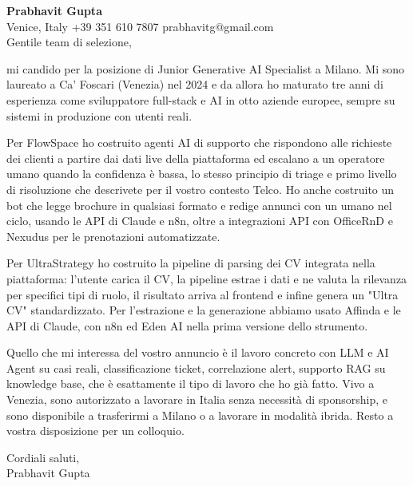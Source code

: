 \documentclass[a4paper,10.5pt]{article}
\begin{document}
\textbf{Prabhavit Gupta}\\
Venice, Italy \textbar{} +39 351 610 7807 \textbar{} prabhavitg@gmail.com\\[10pt]
Gentile team di selezione,

mi candido per la posizione di Junior Generative AI Specialist a Milano. Mi sono laureato a Ca' Foscari (Venezia) nel 2024 e da allora ho maturato tre anni di esperienza come sviluppatore full-stack e AI in otto aziende europee, sempre su sistemi in produzione con utenti reali.

Per FlowSpace ho costruito agenti AI di supporto che rispondono alle richieste dei clienti a partire dai dati live della piattaforma ed escalano a un operatore umano quando la confidenza è bassa, lo stesso principio di triage e primo livello di risoluzione che descrivete per il vostro contesto Telco. Ho anche costruito un bot che legge brochure in qualsiasi formato e redige annunci con un umano nel ciclo, usando le API di Claude e n8n, oltre a integrazioni API con OfficeRnD e Nexudus per le prenotazioni automatizzate.

Per UltraStrategy ho costruito la pipeline di parsing dei CV integrata nella piattaforma: l'utente carica il CV, la pipeline estrae i dati e ne valuta la rilevanza per specifici tipi di ruolo, il risultato arriva al frontend e infine genera un "Ultra CV" standardizzato. Per l'estrazione e la generazione abbiamo usato Affinda e le API di Claude, con n8n ed Eden AI nella prima versione dello strumento.

Quello che mi interessa del vostro annuncio è il lavoro concreto con LLM e AI Agent su casi reali, classificazione ticket, correlazione alert, supporto RAG su knowledge base, che è esattamente il tipo di lavoro che ho già fatto. Vivo a Venezia, sono autorizzato a lavorare in Italia senza necessità di sponsorship, e sono disponibile a trasferirmi a Milano o a lavorare in modalità ibrida. Resto a vostra disposizione per un colloquio.

Cordiali saluti,\\
Prabhavit Gupta
\end{document}
